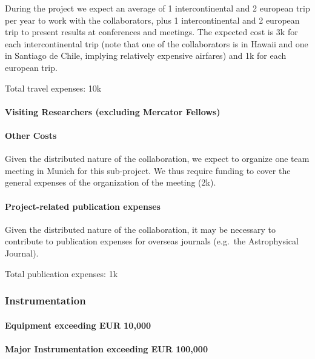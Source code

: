 \documentclass[10pt,fleqn,twoside]{article}
\begin{document}
During the project we expect an average of 1 intercontinental and 2 european
trip per year to work with the collaborators, plus 1 intercontinental and 2
european trip to present results at conferences and meetings. The expected
cost is 3k\EUR{} for each intercontinental trip (note that one of the
collaborators is in Hawaii and one in Santiago de Chile, implying relatively
expensive airfares) and 1k\EUR{} for each european trip.  \smallskip

Total travel expenses: 10k\EUR{}


\paragraph{Visiting Researchers (excluding Mercator Fellows)}

\todo{[Text]}

\paragraph{Other Costs}

Given the distributed nature of the collaboration, we expect to organize one team meeting in 
Munich for this sub-project. We thus require funding to cover the general expenses of the 
organization of the meeting (2k\EUR{}).

\paragraph{Project-related publication expenses}

Given the distributed nature of the collaboration, it may be necessary to contribute to publication expenses for overseas journals (e.g.\ the Astrophysical Journal). 

Total publication expenses: 1k\EUR{}

\subsubsection{Instrumentation}

\todo{[Text]}

\paragraph{Equipment exceeding EUR 10,000} 

\todo{[Text]}

\paragraph{Major Instrumentation exceeding EUR 100,000} 
\end{document}
